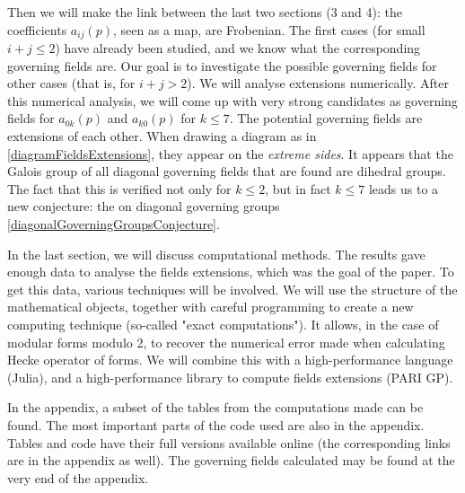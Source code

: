 Then we will make the link between the last two sections (3 and 4): the coefficients $a_{ij}(p)$, seen as a map, are Frobenian.
The first cases (for small $i+j \leq 2$) have already been studied, and we know what the corresponding governing fields are.
Our goal is to investigate the possible governing fields for other cases (that is, for $i+j>2$).
We will analyse extensions numerically.
After this numerical analysis, we will come up with very strong candidates as governing fields for $a_{0k}(p)$ and $a_{k0}(p)$ for $k \leq 7$.
The potential governing fields are extensions of each other.
When drawing a diagram as in \ref{diagramFieldsExtensions}, they appear on the \textit{extreme sides}.
It appears that the Galois group of all diagonal governing fields that are found are dihedral groups.
The fact that this is verified not only for $k \leq 2$, but in fact $k \leq 7$ leads us to a new conjecture: the on diagonal governing groups \ref{diagonalGoverningGroupsConjecture}.

In the last section, we will discuss computational methods.
The results gave enough data to analyse the fields extensions, which was the goal of the paper.
To get this data, various techniques will be involved.
We will use the structure of the mathematical objects, together with careful programming to create a new computing technique (so-called "exact computations").
It allows, in the case of modular forms modulo 2, to recover the numerical error made when calculating Hecke operator of forms.
We will combine this with a high-performance language (Julia), and a high-performance library to compute fields extensions (PARI GP).

In the appendix, a subset of the tables from the computations made can be found.
The most important parts of the code used are also in the appendix.
Tables and code have their full versions available online (the corresponding links are in the appendix as well).
The governing fields calculated may be found at the very end of the appendix.
